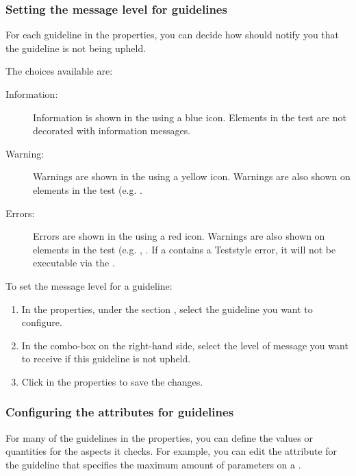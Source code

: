 \subsubsection{Setting the message level for guidelines}
\label{TeststyleMessageLevel}

For each guideline in the \gdproject{} properties, you can decide how \app{} should notify you that the guideline is not being upheld. 

The choices available are:
\begin{description}
\item [Information:]{Information is shown in the \gdprobview{} using a blue icon. Elements in the test are not decorated with information messages.}
\item [Warning:]{Warnings are shown in the \gdprobview{} using a yellow icon. Warnings are also shown on elements in the test (e.g. \gdcases{}.}
\item[Errors:]{Errors are shown in the \gdprobview{} using a red icon. Warnings are also shown on elements in the test (e.g. \gdcases{}, \gdsuites{}. If a \gdsuite{} contains a Teststyle error, it will not be executable via the \ite{}.}
\end{description}

To set the message level for a guideline:
\begin{enumerate}
\item In the \gdproject{} properties, under the section , select the guideline you want to configure.
\item In the combo-box on the right-hand side, select the level of message you want to receive if this guideline is not upheld.
\item Click  in the \gdproject{} properties to save the changes. 
\end{enumerate}

\subsubsection{Configuring the attributes for guidelines}
\label{TeststyleAttributes}

For many of the guidelines in the \gdproject{} properties, you can define the values or quantities for the aspects it checks. For example, you can edit the attribute  for the guideline that specifies the maximum amount of parameters on a \gdcase{}. 

